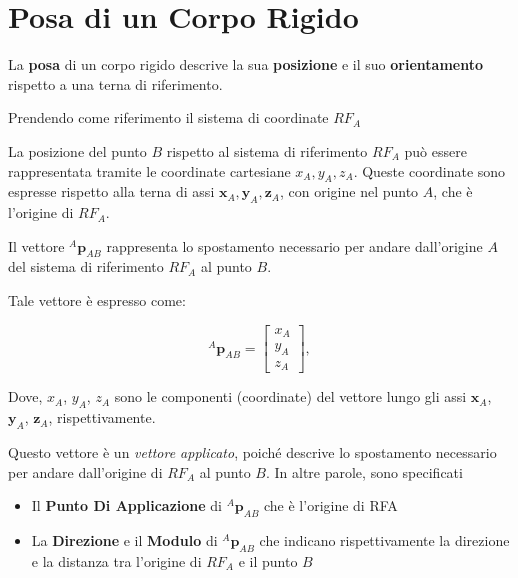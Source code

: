 ﻿\documentclass[11pt, a4paper]{article}
\author{Francesco Lo Verde}
\begin{document}
\section{Posa di un Corpo Rigido}
La \textbf{posa} di un corpo rigido descrive la sua \textbf{posizione} e il suo \textbf{orientamento} rispetto a una terna di riferimento.

Prendendo come riferimento il sistema di coordinate $ RF_A $
\begin{center}
\end{center}
La posizione del punto $ B $ rispetto al sistema di riferimento $ RF_{A} $ può essere rappresentata tramite le coordinate cartesiane $ x_{A}, y_{A}, z_{A} $. Queste coordinate sono espresse rispetto alla terna di assi $ \mathbf{x}_A, \mathbf{y}_A, \mathbf{z}_A $, con origine nel punto $ A $, che è l'origine di $ RF_{A} $.

Il vettore $ ^{A}\mathbf{p}_{AB} $ rappresenta lo spostamento necessario per andare dall'origine $ A $ del sistema di riferimento $ RF_{A} $ al punto $ B $.


Tale vettore è espresso come:

$$
^{A}\mathbf{p}_{AB} =
\begin{bmatrix}
x_A \\
y_A \\
z_A
\end{bmatrix},
$$

Dove, $ x_{A} $, $ y_{A} $, $ z_{A} $ sono le componenti (coordinate) del vettore lungo gli assi $ \mathbf{x}_A $, $ \mathbf{y}_A $, $ \mathbf{z}_A $, rispettivamente.

Questo vettore è un \textit{vettore applicato}, poiché descrive lo spostamento necessario per andare dall'origine di $ RF_A $ al punto $ B $. In altre parole, sono specificati
\begin{itemize}
    \item Il \textbf{Punto Di Applicazione} di $^{A}\mathbf{p}_{AB}$ che è l'origine di RFA
    \item La \textbf{Direzione} e il \textbf{Modulo} di $^{A}\mathbf{p}_{AB}$ che indicano rispettivamente la direzione e la distanza tra l'origine di $ RF_A $ e il punto $ B $
\end{itemize}
\end{document}
